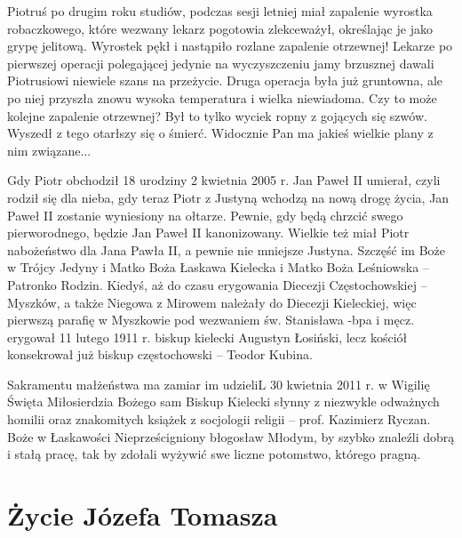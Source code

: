 Piotruś po drugim roku studiów, podczas sesji letniej miał zapalenie wyrostka robaczkowego, które wezwany lekarz pogotowia zlekceważył, określając je jako grypę jelitową. Wyrostek pękł i nastąpiło rozlane zapalenie otrzewnej! Lekarze po pierwszej operacji polegającej jedynie na wyczyszczeniu jamy brzusznej dawali Piotrusiowi niewiele szans na przeżycie. Druga operacja była już gruntowna, ale po niej przyszła znowu wysoka temperatura i wielka niewiadoma. Czy to może kolejne zapalenie otrzewnej? Był to tylko wyciek ropny z gojących się szwów. Wyszedł z tego otarłszy się o śmierć. Widocznie Pan ma jakieś wielkie plany z nim związane...

Gdy Piotr obchodził 18 urodziny 2 kwietnia 2005 r. Jan Paweł II umierał, czyli rodził się dla nieba, gdy teraz Piotr z Justyną wchodzą na nową drogę życia, Jan Paweł II zostanie wyniesiony na ołtarze. Pewnie, gdy będą chrzcić  swego pierworodnego, będzie Jan Paweł II kanonizowany. Wielkie też miał Piotr nabożeństwo dla Jana Pawła II, a pewnie nie mniejsze Justyna. Szczęść im Boże w Trójcy Jedyny i Matko Boża Łaskawa Kielecka i Matko Boża Leśniowska – Patronko Rodzin. Kiedyś, aż do czasu erygowania Diecezji Częstochowskiej – Myszków, a także Niegowa z Mirowem należały do Diecezji Kieleckiej, więc pierwszą parafię w Myszkowie pod wezwaniem św. Stanisława -bpa i męcz. erygował 11 lutego 1911 r. biskup kielecki Augustyn Łosiński, lecz kościół konsekrował już biskup częstochowski – Teodor Kubina.

Sakramentu małżeństwa ma zamiar im udzieliL 30 kwietnia 2011 r. w Wigilię Święta Miłosierdzia Bożego sam Biskup Kielecki słynny z niezwykle odważnych homilii oraz znakomitych książek z socjologii religii – prof. Kazimierz Ryczan. Boże w Łaskawości Nieprześcigniony błogosław Młodym, by szybko znaleźli dobrą i stałą pracę, tak by zdołali wyżywić swe liczne potomstwo, którego pragną.













\clearpage
\section{Życie Józefa Tomasza}

